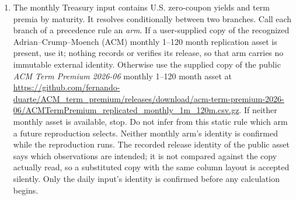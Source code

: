 \documentclass[11pt]{article}
\begin{document}
\begin{enumerate}
\item The monthly Treasury input contains U.S. zero-coupon yields and term premia by maturity. It
resolves conditionally between two branches. Call each branch of a precedence rule an \emph{arm}.
If a user-supplied copy of the recognized Adrian--Crump--Moench (ACM) monthly 1--120 month
replication asset is present, use it; nothing records or verifies its release, so that arm carries
no immutable external identity. Otherwise use the supplied copy of the public \emph{ACM Term Premium
2026-06} monthly 1--120 month asset at
\url{https://github.com/fernando-duarte/ACM_term_premium/releases/download/acm-term-premium-2026-06/ACMTermPremium_replicated_monthly_1m_120m.csv.gz}.
If neither monthly asset is available, stop. Do not infer from this static rule which arm a future
reproduction selects. Neither monthly arm's identity is confirmed while the reproduction runs. The
recorded release identity of the public asset says which observations are intended; it is not
compared against the copy actually read, so a substituted copy with the same column layout is
accepted silently. Only the daily input's identity is confirmed before any calculation begins.


\end{enumerate}
\end{document}
